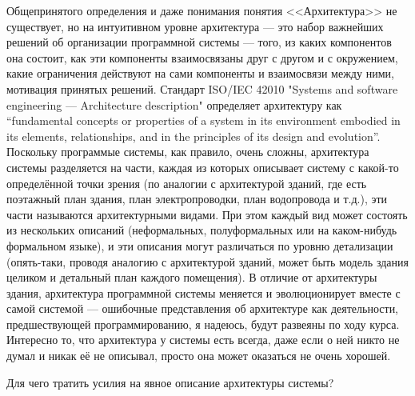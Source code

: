 \documentclass[a5paper]{article}
\begin{document}
Общепринятого определения и даже понимания понятия <<Архитектура>> не существует, но на интуитивном уровне архитектура --- это набор важнейших решений об организации программной системы --- того, из каких компонентов она состоит, как эти компоненты взаимосвязаны друг с другом и с окружением, какие ограничения действуют на сами компоненты и взаимосвязи между ними, мотивация принятых решений. Стандарт ISO/IEC 42010 "Systems and software engineering --- Architecture description" определяет архитектуру как ``fundamental concepts or properties of a system in its environment embodied in its elements, relationships, and in the principles of its design and evolution''. Поскольку программые системы, как правило, очень сложны, архитектура системы разделяется на части, каждая из которых описывает систему с какой-то определённой точки зрения (по аналогии с архитектурой зданий, где есть поэтажный план здания, план электропроводки, план водопровода и т.д.), эти части называются архитектурными видами. При этом каждый вид может состоять из нескольких описаний (неформальных, полуформальных или на каком-нибудь формальном языке), и эти описания могут различаться по уровню детализации (опять-таки, проводя аналогию с архитектурой зданий, может быть модель здания целиком и детальный план каждого помещения). В отличие от архитектуры здания, архитектура программной системы меняется и эволюционирует вместе с самой системой --- ошибочные представления об архитектуре как деятельности, предшествующей программированию, я надеюсь, будут развеяны по ходу курса. Интересно то, что архитектура у системы есть всегда, даже если о ней никто не думал и никак её не описывал, просто она может оказаться не очень хорошей.

Для чего тратить усилия на явное описание архитектуры системы?
\end{document}
